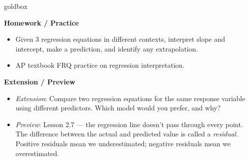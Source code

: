 \documentclass[10pt]{article}
\begin{document}
\begin{skillbox}{goldbox}
\begin{minipage}[t]{0.48\linewidth}
    \textbf{Homework / Practice}
    \begin{itemize}
        \item Given 3 regression equations in different contexts, interpret slope and intercept, make a prediction, and identify any extrapolation.
        \item AP textbook FRQ practice on regression interpretation.
    \end{itemize}
\end{minipage}
\hfill
\begin{minipage}[t]{0.48\linewidth}
    \textbf{Extension / Preview}
    \begin{itemize}
        \item \textit{Extension}: Compare two regression equations for the same response variable using different predictors. Which model would you prefer, and why?
        \item \textit{Preview}: Lesson 2.7 --- the regression line doesn't pass through every point. The difference between the actual and predicted value is called a \textit{residual}. Positive residuals mean we underestimated; negative residuals mean we overestimated.
    \end{itemize}
\end{minipage}
\end{skillbox}
\end{document}
